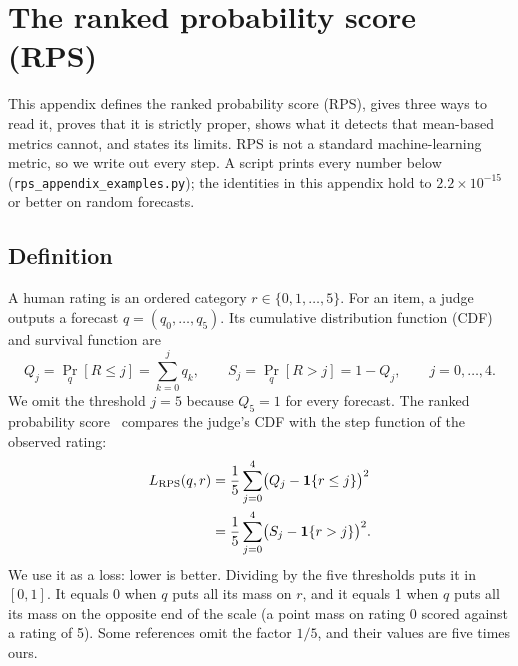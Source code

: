 \section{The ranked probability score (RPS)}
\label{app:rps}

This appendix defines the ranked probability score (RPS), gives three ways to read it, proves that it is strictly proper, shows what it detects that mean-based metrics cannot, and states its limits.
RPS is not a standard machine-learning metric, so we write out every step.
A script prints every number below (\texttt{rps\_appendix\_examples.py}); the identities in this appendix hold to $2.2\times10^{-15}$ or better on random forecasts.

\subsection{Definition}
\label{app:rps-def}

A human rating is an ordered category $r\in\{0,1,\dots,5\}$.
For an item, a judge outputs a forecast $q=(q_0,\dots,q_5)$.
Its cumulative distribution function (CDF) and survival function are
\begin{equation}
Q_j=\Pr_q[R\le j]=\sum_{k=0}^{j}q_k,\qquad S_j=\Pr_q[R>j]=1-Q_j,\qquad j=0,\dots,4 .
\end{equation}
We omit the threshold $j=5$ because $Q_5=1$ for every forecast.
The ranked probability score~\citep{epstein1969scoring} compares the judge's CDF with the step function of the observed rating:
\begin{align}
L_{\mathrm{RPS}}(q,r)&=\frac15\sum_{j=0}^{4}\bigl(Q_j-\mathbf{1}\{r\le j\}\bigr)^2 \label{eq:rps-cdf}\\
&=\frac15\sum_{j=0}^{4}\bigl(S_j-\mathbf{1}\{r>j\}\bigr)^2 .\label{eq:rps-sf}
\end{align}
We use it as a loss: lower is better.
Dividing by the five thresholds puts it in $[0,1]$.
It equals 0 when $q$ puts all its mass on $r$, and it equals 1 when $q$ puts all its mass on the opposite end of the scale (a point mass on rating 0 scored against a rating of 5).
Some references omit the factor $1/5$, and their values are five times ours.

